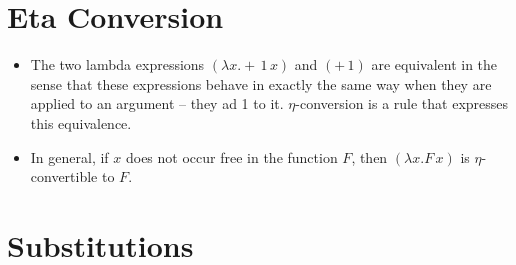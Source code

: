\documentclass[]{article}
\begin{document}
\section{Eta Conversion}
\begin{itemize}
\item The two lambda expressions $(\lambda x.+\,1\,x)$ and $(+\,1)$ are equivalent in the sense that these expressions behave in exactly the same way when they are applied to an argument -- they ad 1 to it. $\eta$-conversion is a rule that expresses this equivalence.
\item In general, if $x$ does not occur free in the function $F$, then $(\lambda x.F\,x)$ is $\eta$-convertible to $F$.
\end{itemize}

\section{Substitutions}
\end{document}
